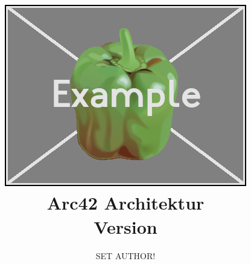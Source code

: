


\makeglossaries




\title{\includegraphics[width=\textwidth]{../res/logo.png}\\
	Arc42 Architektur\\
	\small{Version \vhCurrentVersion}}
\author{SET AUTHOR!}
\date{\vhCurrentDate}


	\maketitle
	
	\tableofcontents
	\newpage
	
	
	
	
	
	
	
	
	
	
	
	
	
